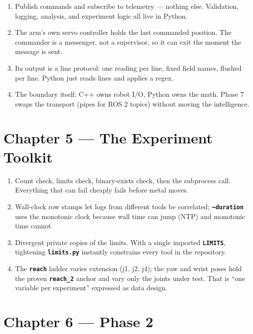 \documentclass[11pt,twoside,openright]{book}
\newcommand{\code}[1]{\texttt{\bfseries #1}}
\begin{document}
\begin{enumerate}
  \item Publish commands and subscribe to telemetry --- nothing else.
    Validation, logging, analysis, and experiment logic all live in
    Python.
  \item The arm's own servo controller holds the last commanded
    position. The commander is a messenger, not a supervisor, so it can
    exit the moment the message is sent.
  \item Its output is a line protocol: one reading per line, fixed field
    names, flushed per line. Python just reads lines and applies a
    regex.
  \item The boundary itself: C++ owns robot I/O, Python owns the math.
    Phase 7 swaps the transport (pipes for ROS 2 topics) without moving
    the intelligence.
\end{enumerate}

\section{Chapter 5 --- The Experiment Toolkit}

\begin{enumerate}
  \item Count check, limits check, binary-exists check, then the
    subprocess call. Everything that can fail cheaply fails before metal
    moves.
  \item Wall-clock row stamps let logs from different tools be
    correlated; \code{--duration} uses the monotonic clock because wall
    time can jump (NTP) and monotonic time cannot.
  \item Divergent private copies of the limits. With a single imported
    \code{LIMITS}, tightening \code{limits.py} instantly constrains
    every tool in the repository.
  \item The \code{reach} ladder varies extension (j1, j2, j4); the yaw
    and wrist poses hold the proven \code{reach\_2} anchor and vary only
    the joints under test. That is ``one variable per experiment''
    expressed as data design.
\end{enumerate}

\section{Chapter 6 --- Phase 2}
\end{document}
